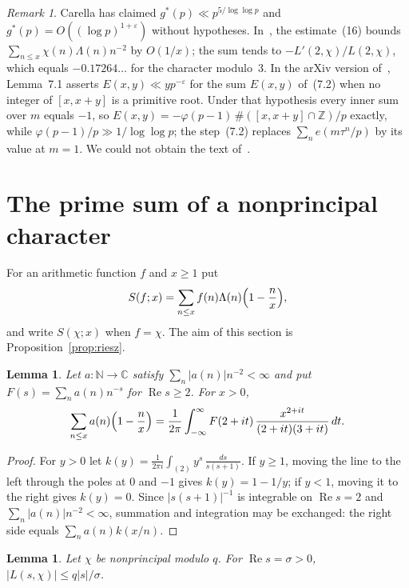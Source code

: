 \documentclass[12pt]{amsart}
\newtheorem{lemma}[theorem]{Lemma}
\theoremstyle{remark}
\newtheorem{remark}[theorem]{Remark}
\renewcommand{\Re}{\operatorname{Re}}
\newcommand{\C}{\mathbb{C}}
\begin{document}
\begin{remark}\label{rem:carella}
Carella has claimed $g^*(p)\ll p^{5/\log\log p}$ \cite{Car15} and
$g^*(p)=O((\log p)^{1+\varepsilon})$ \cite{Car18,Car25} without hypotheses. In~\cite{Car15}, the
estimate~(16) bounds $\sum_{n\le x}\chi(n)\Lambda(n)n^{-2}$ by $O(1/x)$; the sum tends to
$-L'(2,\chi)/L(2,\chi)$, which equals $-0.17264\ldots$ for the character modulo~$3$. In the
arXiv version of~\cite{Car18}, Lemma~7.1 asserts $E(x,y)\ll yp^{-\varepsilon}$ for the sum
$E(x,y)$ of~(7.2) when no integer of $[x,x+y]$ is a primitive root. Under that hypothesis every
inner sum over $m$ equals $-1$, so $E(x,y)=-\varphi(p-1)\,\#([x,x+y]\cap\mathbb Z)/p$ exactly,
while $\varphi(p-1)/p\gg1/\log\log p$; the step~(7.2) replaces $\sum_ne(m\tau^n/p)$ by its value
at $m=1$. We could not obtain the text of~\cite{Car25}.
\end{remark}

\section{The prime sum of a nonprincipal character}

For an arithmetic function $f$ and $x\ge1$ put
\[
  S(f;x)=\sum_{n\le x}f(n)\Lambda(n)\Bigl(1-\frac nx\Bigr),
\]
and write $S(\chi;x)$ when $f=\chi$. The aim of this section is Proposition~\ref{prop:riesz}.

\begin{lemma}\label{lem:mellin}
Let $a\colon\mathbb N\to\C$ satisfy $\sum_n|a(n)|n^{-2}<\infty$ and put $F(s)=\sum_na(n)n^{-s}$
for $\Re s\ge2$. For $x>0$,
\[
  \sum_{n\le x}a(n)\Bigl(1-\frac nx\Bigr)=\frac1{2\pi}\int_{-\infty}^{\infty}
  F(2+it)\,\frac{x^{2+it}}{(2+it)(3+it)}\,dt.
\]
\end{lemma}

\begin{proof}
For $y>0$ let $k(y)=\frac1{2\pi i}\int_{(2)}y^s\,\frac{ds}{s(s+1)}$. If $y\ge1$, moving the line
to the left through the poles at $0$ and $-1$ gives $k(y)=1-1/y$; if $y<1$, moving it to the right
gives $k(y)=0$. Since $|s(s+1)|^{-1}$ is integrable on $\Re s=2$ and
$\sum_n|a(n)|n^{-2}<\infty$, summation and integration may be exchanged:
the right side equals $\sum_na(n)k(x/n)$.
\end{proof}

\begin{lemma}\label{lem:size}
Let $\chi$ be nonprincipal modulo $q$. For $\Re s=\sigma>0$, $|L(s,\chi)|\le q|s|/\sigma$.
\end{lemma}
\end{document}

